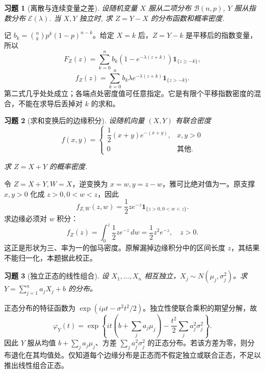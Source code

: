 \documentclass[12pt,fontset=fandol]{ctexart}
\newtheorem{exercise}{习题}[section]
\begin{document}
\begin{exercise}[离散与连续变量之差]\label{q:A4.19}
设随机变量 $X$ 服从二项分布 $\mathcal{B}(n,p)$, $Y$ 服从指数分布 $\mathcal{E}(\lambda)$. 当 $X,Y$ 独立时, 求 $Z=Y-X$ 的分布函数和概率密度.\par{}
\end{exercise}

\begin{solve}\label{a:A4.19}记 $b_k=\binom nkp^k(1-p)^{n-k}$。给定 $X=k$ 后，$Z=Y-k$ 是平移后的指数变量，所以\[F_Z(z)=\sum_{k=0}^n b_k(1-e^{-\lambda(z+k)})\mathbf1_{\{z\ge-k\}},\]\[f_Z(z)=\sum_{k=0}^n b_k\lambda e^{-\lambda(z+k)}\mathbf1_{\{z>-k\}}.\]第二式几乎处处成立；各端点处密度值可任意指定。它是有限个平移指数密度的混合，不能在求导后丢掉对 $k$ 的求和。\end{solve}

\begin{exercise}[求和变换后的边缘积分]\label{q:A4.23}
设随机向量 $(X,Y)$ 有联合密度
    \[f(x,y)=\begin{cases}
        \dfrac{1}{2}(x+y)e^{-(x+y)}, & x,y>0 \\
        0 & \text{其他}.
    \end{cases}\]

    求 $Z=X+Y$ 的概率密度.\par{}
\end{exercise}

\begin{solve}\label{a:A4.23}令 $Z=X+Y,W=X$，逆变换为 $x=w,y=z-w$，雅可比绝对值为一。原支撑 $x,y>0$ 化成 $z>0,0<w<z$，因此\[f_{Z,W}(z,w)=\frac12ze^{-z}\mathbf1_{\{z>0,0<w<z\}}.\]求边缘必须对 $w$ 积分：\[f_Z(z)=\int_0^z\frac12ze^{-z}\,dw=\frac12z^2e^{-z},\quad z>0.\]这正是形状为三、率为一的伽马密度。原解漏掉边缘积分中的区间长度 $z$，其结果不能归一化，本题据此校正。\end{solve}

\begin{exercise}[独立正态的线性组合]\label{q:A4.27}
设 $X_1,\ldots,X_n$ 相互独立，$X_j\sim N(\mu_j,\sigma_j^2)$。求 $Y=\sum_{j=1}^n a_jX_j+b$ 的分布。\par{}
\end{exercise}

\begin{solve}\label{a:A4.27}正态分布的特征函数为 $\exp(i\mu t-\sigma^2t^2/2)$。独立性使联合乘积的期望分解，故\[\varphi_Y(t)=\exp\left\{it\left(b+\sum_ja_j\mu_j\right)-\frac{t^2}{2}\sum_ja_j^2\sigma_j^2\right\}.\]因此 $Y$ 服从均值 $b+\sum_ja_j\mu_j$、方差 $\sum_ja_j^2\sigma_j^2$ 的正态分布。若该方差为零，则分布退化在其均值处。仅知道每个边缘分布是正态而不假定独立或联合正态，不足以推出线性组合正态。\end{solve}
\end{document}

